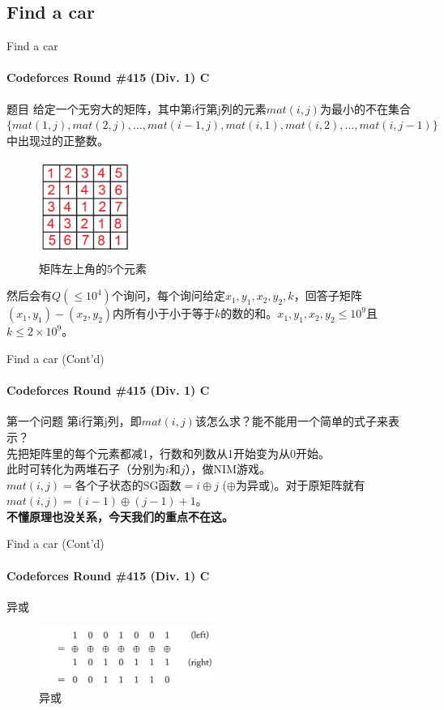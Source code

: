 \documentclass[hyperref={unicode=true}]{beamer}
\theoremstyle{definition}
\theoremstyle{proof}
\begin{document}
\subsection{Find a car}
\begin{frame}{Find a car}\framesubtitle{Codeforces Round \#415 (Div. 1) C}
  \begin{block}{题目}
    给定一个无穷大的矩阵，其中第i行第j列的元素$mat(i,j)$为最小的不在集合$\{mat(1,j),mat(2,j),\ldots,mat(i-1,j), mat(i,1), mat(i,2), \ldots,mat(i,j-1)\}$中出现过的正整数。
    \begin{minipage}{0.45\linewidth}
      \begin{figure}
        \centering
        \includegraphics[width=1.2in]{figures/upper5.png}
        \caption{矩阵左上角的5个元素}\label{fig:upper5}
      \end{figure}
    \end{minipage}
    \begin{minipage}{0.45\linewidth}
      然后会有$Q(\leq 10^4)$个询问，每个询问给定$x_1,y_1,x_2,y_2,k$，回答子矩阵$(x_1,y_1)-(x_2,y_2)$内所有小于小于等于$k$的数的和。$x_1,y_1,x_2,y_2\leq 10^9$且$k\leq2\times 10^9$。
    \end{minipage}
  \end{block}
\end{frame}

\begin{frame}{Find a car (Cont'd)}\framesubtitle{Codeforces Round \#415 (Div. 1) C}
  \begin{alertblock}{第一个问题}
    第i行第j列，即$mat(i,j)$该怎么求？能不能用一个简单的式子来表示？\\
    \pause{}先把矩阵里的每个元素都减1，行数和列数从1开始变为从0开始。\\
    \pause{}此时可转化为两堆石子（分别为$i$和$j$），做NIM游戏。$mat(i,j)=\text{各个子状态的SG函数}=i \oplus j$ ($\oplus$为异或)。对于原矩阵就有$mat(i,j)=(i-1)\oplus (j-1) + 1$。\\
    {\bf 不懂原理也没关系，今天我们的重点不在这。}
  \end{alertblock}
\end{frame}

\begin{frame}{Find a car (Cont'd)}\framesubtitle{Codeforces Round \#415 (Div. 1) C}
  \begin{block}{异或}
    \begin{figure}
      \includegraphics[width=2.3in]{figures/xor.png}
      \caption{异或}\label{fig:xor}
    \end{figure}
  \end{block}
\end{frame}
\end{document}
